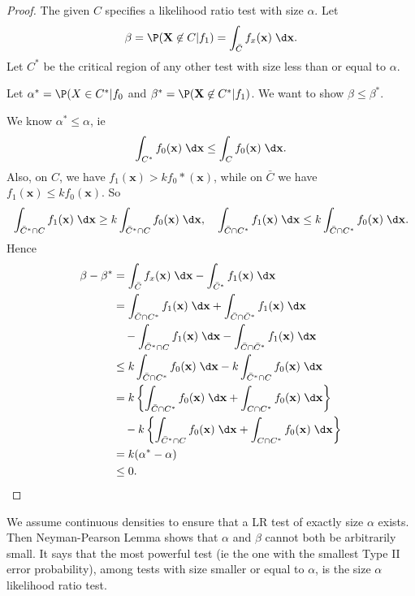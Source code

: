 \documentclass[a4paper]{article}
\begin{document}
\begin{proof}
  The given $C$ specifies a likelihood ratio test with size $\alpha$. Let
  \[
    \beta = \P(\mathbf{X}\not\in C|f_1) = \int_{\bar C}f_x(\mathbf{x})\;\d \mathbf{x}.
  \]
  Let $C^*$ be the critical region of any other test with size less than or equal to $\alpha$.

  Let $\alpha^* = \P(X\in C^*|f_0$ and $\beta^* = \P(\mathbf{X}\not\in C^*|f_1)$. We want to show $\beta \leq \beta^*$.

  We know $\alpha^* \leq \alpha$, ie
  \[
    \int_{C^*}f_0(\mathbf{x})\;\d \mathbf{x}\leq \int_Cf_0(\mathbf{x}) \;\d \mathbf{x}.
  \]
  Also, on $C$, we have $f_1(\mathbf{x}) > kf_0*(\mathbf{x})$, while on $\bar C$ we have $f_1(\mathbf{x}) \leq kf_0(\mathbf{x})$. So
  \[
    \int_{\bar C^*\cap C} f_1(\mathbf{x}) \;\d \mathbf{x} \geq k\int_{\bar C^*\cap C}f_0(\mathbf{x}) \;\d \mathbf{x},\quad \int_{\bar C\cap C^*}f_1(\mathbf{x}) \;\d \mathbf{x} \leq k\int_{\bar C\cap C^*}f_0 (\mathbf{x})\;\d \mathbf{x}.
  \]
  Hence
  \begin{align*}
    \beta - \beta^* &= \int_{\bar C}f_x(\mathbf{x}) \;\d \mathbf{x} - \int_{\bar C^*}f_1(\mathbf{x})\;\d \mathbf{x}\\
    &= \int_{\bar C\cap C^*} f_1(\mathbf{x}) \;\d \mathbf{x} + \int_{\bar C\cap \bar C^*}f_1(\mathbf{x})\;\d \mathbf{x} \\
    &\quad - \int_{\bar C^*\cap C} f_1(\mathbf{x}) \;\d \mathbf{x} - \int_{\bar C\cap \bar C^*}f_1(\mathbf{x})\;\d \mathbf{x}\\
    &\leq k\int_{\bar C \cap C^*}f_0(\mathbf{x})\;\d \mathbf{x} - k\int_{\bar C^*\cap C}f_0(\mathbf{x})\;\d \mathbf{x}\\
    &= k\left\{\int_{\bar C\cap C^*}f_0(\mathbf{x})\;\d \mathbf{x} + \int_{C \cap C^*}f_0(\mathbf{x})\;\d \mathbf{x}\right\} \\
    &\quad- k\left\{\int_{\bar C^*\cap C}f_0(\mathbf{x})\;\d \mathbf{x} + \int_{C\cap C^*}f_0(\mathbf{x})\;\d \mathbf{x}\right\}\\
    &= k(\alpha^* - \alpha)\\
    &\leq 0.
  \end{align*}
\end{proof}

\note We assume continuous densities to ensure that a LR test of exactly size $\alpha$ exists. Then Neyman-Pearson Lemma shows that $\alpha$ and $\beta$ cannot both be arbitrarily small. It says that the most powerful test (ie the one with the smallest Type II error probability), among tests with size smaller or equal to $\alpha$, is the size $\alpha$ likelihood ratio test.
\end{document}
